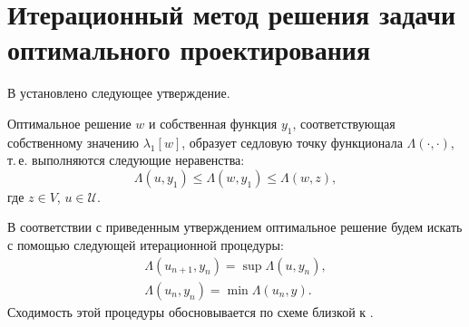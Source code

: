\section{Итерационный метод решения задачи оптимального проектирования}
\label{section:IterationMethod}

В
\cite{article:Problems}
установлено следующее утверждение.
\begin{theorem}
Оптимальное решение $w$ и собственная функция $y_1$, соответствующая собственному значению $\lambda_1[w]$,
образует седловую точку функционала $\Lambda(\cdot, \cdot)$,
т.\,е.
выполняются следующие неравенства:
\[
\Lambda(u, y_1)
\leq
\Lambda(w, y_1)
\leq
\Lambda(w, z),
\]
где
$z \in V$, $u \in \mathcal{U}$.
\end{theorem}
%
%
%
\par
В соответствии с приведенным утверждением оптимальное решение будем искать с помощью следующей итерационной
процедуры:
\[
\begin{gathered}
\Lambda(u_{n + 1}, y_n)
=
\sup \Lambda(u, y_n),
\\
\Lambda(u_n, y_n)
=
\min \Lambda(u_n, y).
\end{gathered}
\]
Сходимость этой процедуры обосновывается по схеме близкой к
\cite{article:Goncharov:Wing}.